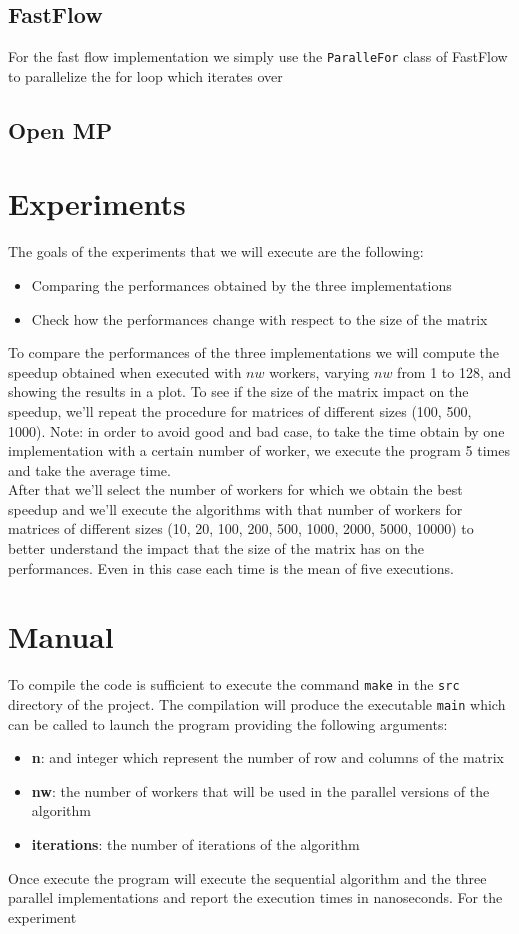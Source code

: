 \documentclass[12pt]{article}
\begin{document}
	\subsection{FastFlow}
	For the fast flow implementation we simply use the \verb|ParalleFor| class of FastFlow to parallelize the for loop which iterates over 
	
	\subsection{Open MP}
	
	
	
	\section{Experiments}
	The goals of the experiments that we will execute are the following: 
	\begin{itemize}
		\item Comparing the performances obtained by the three implementations 
		\item Check how the performances change with respect to the size of the matrix
	\end{itemize}
	To compare the performances of the three implementations we will compute the speedup obtained when executed with $nw$ workers, varying $nw$ from 1 to 128, and showing the results in a plot. To see if the size of the matrix impact on the speedup, we'll repeat the procedure for matrices of different sizes (100, 500, 1000). Note: in order to avoid good and bad case, to take the time obtain by one implementation with a certain number of worker, we execute the program 5 times and take the average time. \\
	After that we'll select the number of workers for which we obtain the best speedup and we'll execute the algorithms with that number of workers for matrices of different sizes (10, 20, 100, 200, 500, 1000, 2000, 5000, 10000) to better understand the impact that the size of the matrix has on the performances. Even in this case each time is the mean of five executions.
	
	
	\section{Manual}
	To compile the code is sufficient to execute the command \verb*|make| in the \verb*|src| directory of the project. The compilation will produce the executable \verb*|main| which can be called to launch the program providing the following arguments:
	\begin{itemize}
		\item \textbf{n}: and integer which represent the number of row and columns of the matrix
		\item \textbf{nw}: the number of workers that will be used in the parallel versions of the algorithm
		\item \textbf{iterations}: the number of iterations of the algorithm
	\end{itemize} 
	Once execute the program will execute the sequential algorithm and the three parallel implementations and report the execution times in nanoseconds. For the experiment
\end{document}
